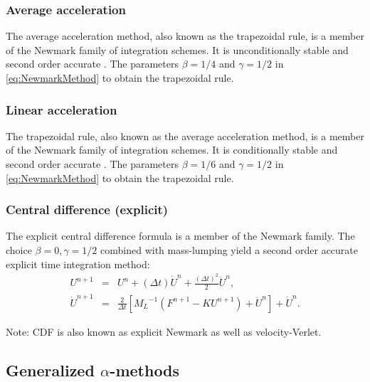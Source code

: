 \documentclass[12pt]{article}
\newcommand{\inverse}[1]{\ensuremath{{#1}^{-1}}} %
\begin{document}
\subsubsection{Average acceleration}

The average acceleration method, also known as the trapezoidal rule, is a 
member of the Newmark family of integration schemes.  
It is unconditionally stable and second order accurate \cite{Hughes2012}.
The parameters $\beta=1/4$ and $\gamma=1/2$ in \eqref{eq:NewmarkMethod}
to obtain the trapezoidal rule.

\subsubsection{Linear acceleration}

The trapezoidal rule, also known as the average acceleration
method, is a member of the Newmark family of integration schemes.  
It is conditionally stable and second order accurate \cite{Hughes2012}.
The parameters $\beta=1/6$ and $\gamma=1/2$ in \eqref{eq:NewmarkMethod}
to obtain the trapezoidal rule.

\subsubsection{Central difference (explicit)}

The explicit central difference formula is a member of the Newmark
family.  The choice $\beta=0, \gamma=1/2$ combined with mass-lumping yield
a second order accurate explicit time integration method:
\begin{eqnarray}
U^{n+1} &=& U^n + (\Delta t)\dot{U}^n + \frac{(\Delta t)^2}{2}\ddot{U}^n,
%
\\
%
\dot{U}^{n+1} &=& \frac{2}{\Delta t}\left[\inverse{M_L}(F^{n+1}-KU^{n+1})+\ddot{U}^n\right]
+\dot{U}^n.
\end{eqnarray}

Note:  CDF is also known as explicit Newmark as well as velocity-Verlet.


\subsection{Generalized $\alpha$-methods}
\end{document}
